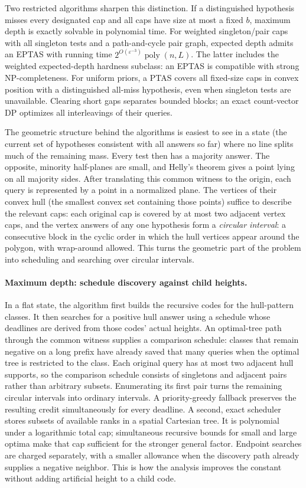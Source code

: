 Two restricted algorithms sharpen this distinction. If a distinguished
hypothesis misses every designated cap and all caps have size at
most a fixed $b$, maximum depth is exactly solvable in polynomial
time. For weighted singleton/pair caps with all singleton tests and
a path-and-cycle pair graph, expected depth admits an EPTAS with
running time $2^{O(\varepsilon^{-3})}\operatorname{poly}(n,L)$.
The latter includes the weighted expected-depth hardness subclass:
an EPTAS is compatible with strong NP-completeness.
For uniform priors, a PTAS covers all fixed-size caps in convex
position with a distinguished all-miss hypothesis, even when singleton
tests are unavailable. Clearing short gaps separates bounded blocks;
an exact count-vector DP optimizes all interleavings of their queries.

The geometric structure behind the algorithms is easiest to see in a
state (the current set of hypotheses consistent with all answers so
far) where no line splits much of the remaining mass. Every test
then has a majority answer. The opposite, minority half-planes are
small, and Helly's theorem gives a point lying on all majority sides.
After translating this common witness to the origin, each query is
represented by a point in a normalized plane. The vertices of their
convex hull (the smallest convex set containing those points) suffice
to describe the relevant caps: each original cap is covered by at
most two adjacent vertex caps, and the vertex
answers of any one hypothesis form a \emph{circular interval}: a
consecutive block in the cyclic order in which the hull vertices
appear around the polygon, with wrap-around allowed. This turns the
geometric part of the problem into scheduling and searching over
circular intervals.

\paragraph{Maximum depth: schedule discovery against child heights.}
In a flat state, the algorithm first builds the recursive codes for
the hull-pattern classes. It then searches for a positive hull answer
using a schedule whose deadlines are derived from those codes' actual
heights. An optimal-tree path through the common witness supplies a
comparison schedule: classes that remain negative on a long prefix
have already saved that many queries when the optimal tree is
restricted to the class. Each original query has at most two
adjacent hull supports, so the comparison schedule consists of
singletons and adjacent pairs rather than arbitrary subsets.
Enumerating its first pair turns the remaining circular intervals
into ordinary intervals. A priority-greedy fallback preserves the
resulting credit simultaneously for every deadline. A second, exact
scheduler stores subsets of available ranks in a spatial Cartesian
tree. It is polynomial under a logarithmic total cap; simultaneous
recursive bounds for small and large optima make that cap sufficient
for the stronger general factor. Endpoint searches
are charged separately, with a smaller allowance when the discovery
path already supplies a negative neighbor. This is how the analysis
improves the constant without adding artificial height to a child
code.

